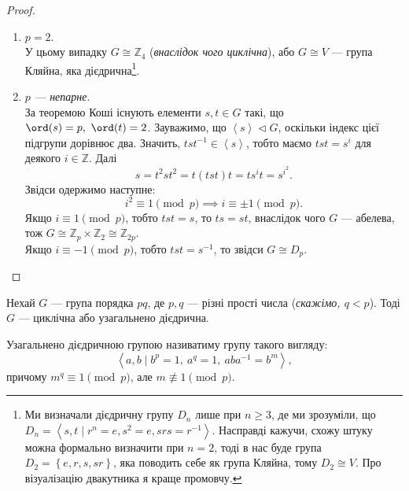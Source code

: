 \documentclass{math_library}
\begin{document}
\begin{proof}
\begin{enumerate}[topsep=0pt,wide=0pt, label={\Roman*.}]
\item \textit{$p = 2$}.\\
У цьому випадку $G \cong \mathbb{Z}_4$ (\textit{внаслідок чого циклічна}), або $G \cong V$ --- група Кляйна, яка дієдрична\footnote{Ми визначали дієдричну групу $D_n$ лише при $n \geq 3$, де ми зрозуміли, що $D_n = \left<s,t \mid r^n = e, s^2 = e, srs = r^{-1}\right>$. Насправді кажучи, схожу штуку можна формально визначити при $n = 2$, тоді в нас буде група $D_2 = \left\{ e,r,s,sr \right\}$, яка поводить себе як група Кляйна, тому $D_2 \cong V$. Про візуалізацію двакутника я краще промовчу.}.

\item \textit{$p$ --- непарне}.\\
За теоремою Коші існують елементи $s,t \in G$ такі, що $\ord(s) = p,\ \ord(t) = 2$. Зауважимо, що $\left<s\right> \triangleleft G$, оскільки індекс цієї підгрупи дорівнює два. Значить, $tst^{-1} \in \left<s\right>$, тобто маємо $tst = s^i$ для деякого $i \in \mathbb{Z}$. Далі
\[
s = t^2 s t^2 = t (tst) t = ts^i t = s^{i^2}.
\] 
Звідси одержимо наступне:
\[
i^2 \equiv 1 \pmod p \implies i \equiv \pm 1 \pmod p.
\]
Якщо $i \equiv 1 \pmod p$, тобто $tst = s$, то $ts = st$, внаслідок чого $G$ --- абелева, тож $G \cong \mathbb{Z}_p \times \mathbb{Z}_2 \cong \mathbb{Z}_{2p}$.\\
Якщо $i \equiv -1 \pmod p$, тобто $tst = s^{-1}$, то звідси $G \cong D_p$. \qedhere
\end{enumerate}
\end{proof}

\begin{theorem}
Нехай $G$ --- група порядка $pq$, де $p,q$ --- різні прості числа (\textit{скажімо, $q < p$}). Тоді $G$ --- циклічна або узагальнено дієдрична.
\end{theorem}

Узагальнено дієдричною групою називатиму групу такого вигляду:
\[
\left< a,b \mid b^p = 1,\ a^q = 1,\ aba^{-1} = b^m \right>,
\]
причому $m^q \equiv 1 \pmod p$, але $m \not\equiv 1 \pmod p$.
\end{document}
